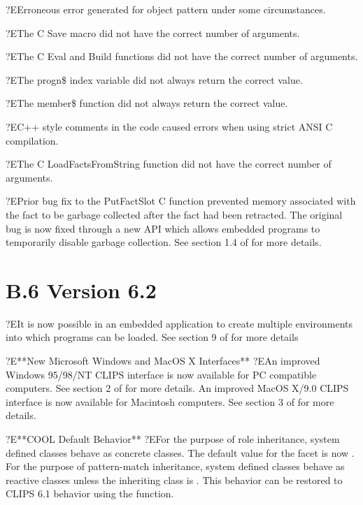 \documentclass[letterpaper,10pt,english]{sphinxmanual}
\begin{document}
?EErroneous error generated for object pattern under some circumstances.

?EThe C Save macro did not have the correct number of arguments.

?EThe C Eval and Build functions did not have the correct number of
arguments.

?EThe progn\$ index variable did not always return the correct value.

?EThe member\$ function did not always return the correct value.

?EC++ style comments in the code caused errors when using strict ANSI C
compilation.

?EThe C LoadFactsFromString function did not have the correct number of
arguments.

?EPrior bug fix to the PutFactSlot C function prevented memory
associated with the fact to be garbage collected after the fact had been
retracted. The original bug is now fixed through a new API which allows
embedded programs to temporarily disable garbage collection. See section
1.4 of  for more details.


\section{B.6 Version 6.2}
\label{\detokenize{appendix:b-6-version-6-2}}
 ?EIt is now possible in an embedded application to
create multiple environments into which programs can be loaded. See
section 9 of  for more details

?E**New Microsoft Windows and MacOS X Interfaces** ?EAn improved Windows
95/98/NT CLIPS interface is now available for PC compatible computers.
See section 2 of  for more details. An improved
MacOS X/9.0 CLIPS interface is now available for Macintosh computers.
See section 3 of  for more details.

?E**COOL Default Behavior** ?EFor the purpose of role inheritance,
system defined classes behave as concrete classes. The default value for
the  facet is now . For the purpose of
pattern-match inheritance, system defined classes behave as reactive
classes unless the inheriting class is . This behavior can
be restored to CLIPS 6.1 behavior using the 
function.
\end{document}
